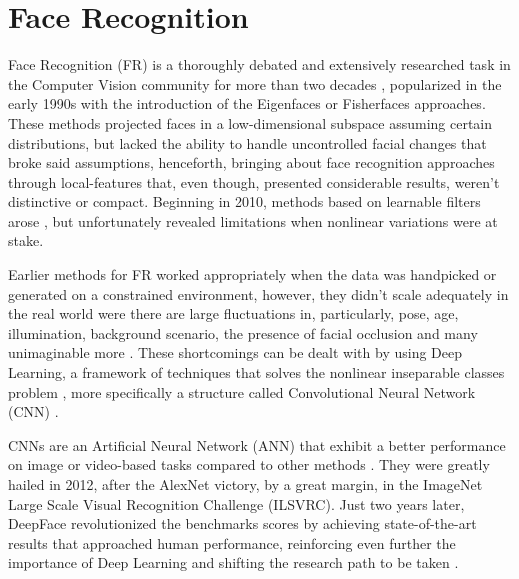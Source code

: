 \documentclass[class=report, crop=false, a4paper, 12pt]{standalone}
\begin{document}
\newpage

\section{Face Recognition}
Face Recognition (FR) is a thoroughly debated and extensively researched task in the Computer Vision community for more than two decades \autocite{ranjanDeepLearningUnderstanding2018}, popularized in the early 1990s with the introduction of the Eigenfaces \autocite{turkEigenfacesRecognition1991} or Fisherfaces \autocite{p.n.belhumeurEigenfacesVsFisherfaces1997} approaches. These methods projected faces in a low-dimensional subspace assuming certain distributions, but lacked the ability to handle uncontrolled facial changes that broke said assumptions, henceforth, bringing about face recognition approaches through local-features \autocite{chengjunliuGaborFeatureBased2002, ahonenFaceDescriptionLocal2006} that, even though, presented considerable results, weren't distinctive or compact. Beginning in 2010, methods based on learnable filters arose \autocite{z.caoFaceRecognitionLearningbased2010,leiLearningDiscriminantFace2014}, but unfortunately revealed limitations when nonlinear variations were at stake.

\par Earlier methods for FR worked appropriately when the data was handpicked or generated on a constrained environment, however, they didn't scale adequately in the real world were there are large fluctuations in, particularly, pose, age, illumination, background scenario, the presence of facial occlusion \autocite{ranjanDeepLearningUnderstanding2018} and many unimaginable more . These shortcomings can be dealt with by using Deep Learning, a framework of techniques that solves the nonlinear inseparable classes problem , more specifically a structure called Convolutional Neural Network (CNN) \autocite{wangDeepFaceRecognition2021}. 

\par CNNs are an Artificial Neural Network (ANN) that exhibit a better performance on image or video-based tasks compared to other methods \autocite{lecunGradientBasedLearningApplied1998}. They were greatly hailed in 2012, after the AlexNet \autocite{krizhevskyImageNetClassificationDeep2012} victory, by a great margin, in the ImageNet Large Scale Visual Recognition Challenge (ILSVRC). Just two years later, DeepFace \autocite{taigmanDeepFaceClosingGap2014} revolutionized the benchmarks scores by achieving state-of-the-art results that approached human performance, reinforcing even further the importance of Deep Learning and shifting the research path to be taken \autocite{wangDeepFaceRecognition2021}.
\end{document}
